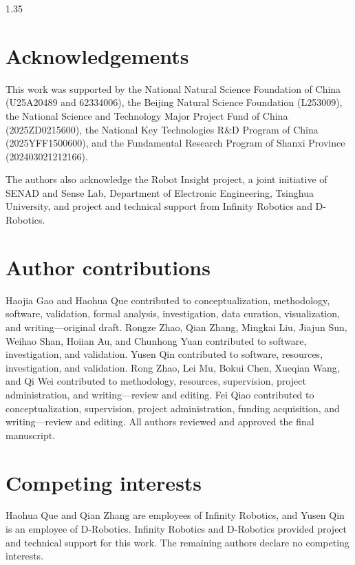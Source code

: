 \documentclass[11pt]{article}
\begin{document}
\begin{spacing}{1.35}
\section{Acknowledgements}

This work was supported by the National Natural Science Foundation of China (U25A20489 and 62334006), the Beijing Natural Science Foundation (L253009), the National Science and Technology Major Project Fund of China (2025ZD0215600), the National Key Technologies R\&D Program of China (2025YFF1500600), and the Fundamental Research Program of Shanxi Province (202403021212166).

The authors also acknowledge the Robot Insight project, a joint initiative of SENAD and Sense Lab, Department of Electronic Engineering, Tsinghua University, and project and technical support from Infinity Robotics and D-Robotics.

\section{Author contributions}

Haojia Gao and Haohua Que contributed to conceptualization, methodology, software, validation, formal analysis, investigation, data curation, visualization, and writing---original draft. Rongze Zhao, Qian Zhang, Mingkai Liu, Jiajun Sun, Weihao Shan, Hoiian Au, and Chunhong Yuan contributed to software, investigation, and validation. Yusen Qin contributed to software, resources, investigation, and validation. Rong Zhao, Lei Mu, Bokui Chen, Xueqian Wang, and Qi Wei contributed to methodology, resources, supervision, project administration, and writing---review and editing. Fei Qiao contributed to conceptualization, supervision, project administration, funding acquisition, and writing---review and editing. All authors reviewed and approved the final manuscript.

\section{Competing interests}

Haohua Que and Qian Zhang are employees of Infinity Robotics, and Yusen Qin is an employee of D-Robotics. Infinity Robotics and D-Robotics provided project and technical support for this work. The remaining authors declare no competing interests.
\end{spacing}
\end{document}
